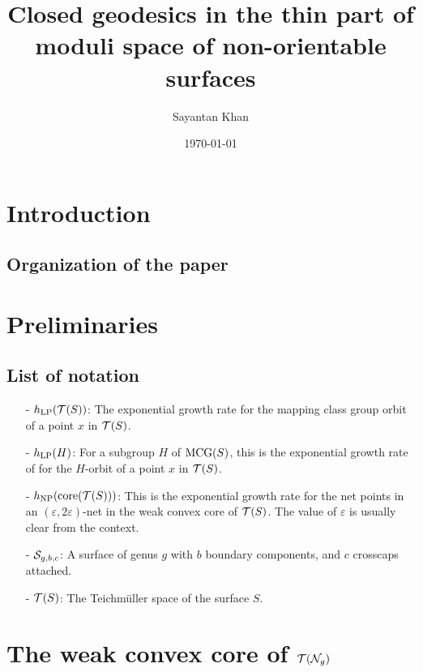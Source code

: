 \documentclass[12pt, reqno]{amsart}
\title{Closed geodesics in the thin part of moduli space of non-orientable surfaces}
\author{Sayantan Khan}
\date{\today}
\begin{document}
\begin{abstract}

\end{abstract}
\maketitle

\section{Introduction}
\label{sec:introduction}

\subsection*{Organization of the paper}

\section{Preliminaries}
\label{sec:preliminaries}

\subsection*{List of notation}
\begin{itemize}
\item[-] $h_{\mathrm{LP}}(\mathcal{T}(S))$: The exponential growth rate for the mapping class group orbit of a point $x$ in $\mathcal{T}(S)$.
\item[-] $h_{\mathrm{LP}}(H)$: For a subgroup $H$ of $\mathrm{MCG}(S)$, this is the exponential growth rate of for the $H$-orbit of a point $x$ in $\mathcal{T}(S)$.
\item[-] $h_{\mathrm{NP}}(\mathrm{core}(\mathcal{T}(S)))$: This is the exponential growth rate for the net points in an $(\varepsilon, 2 \varepsilon)$-net in the weak convex core of $\mathcal{T}(S)$. The value of $\varepsilon$ is usually clear from the context.
\item[-] $\mathcal{S}_{g,b,c}$: A surface of genus $g$ with $b$ boundary components, and $c$ crosscaps attached.
\item[-] $\mathcal{T}(S)$: The Teichmüller space of the surface $S$.
\end{itemize}

\section{The weak convex core of $\mathcal{T}(\mathcal{N}_g)$}
\label{sec:weak-convex-core}
\end{document}

